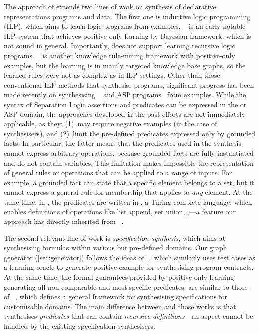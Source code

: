 The approach of \tool extends two lines of work on synthesis of
declarative representations programs and data.
%
The first one is inductive logic programming (ILP), which aims to
learn logic programs from examples.
~\cite{muggleton1997learning} is an early notable ILP
system that achieves positive-only learning by Bayesian framework,
which is not sound in general. Importantly,  does not
support learning recursive logic programs.
%
~\cite{galarraga2013amie} is another knowledge rule-mining
framework with positive-only examples, but the learning is in
 mainly targeted knowledge base graphs, so the learned
rules were not as complex as in ILP settings.
%
Other than those conventional ILP methods that synthesise \prolog
programs, significant progress has been made recently on synthesising
~\cite{thakkar2021example,10.1145/3622847} and ASP
programs~\cite{DBLP:conf/jelia/LawRB14,DBLP:conf/aaai/LawRBB020} from
examples.
%
While the syntax of Separation Logic assertions and predicates can be
expressed in the  or ASP domain, the approaches
developed in the past efforts are not immediately applicable, as they:
(1)~may require negative examples (in the case of 
synthesisers), and (2)~limit the pre-defined predicates expressed only
by grounded facts.
%
In particular, the latter means that the predicates used in the
synthesis cannot express arbitrary operations, because grounded facts
are fully instantiated and do not contain variables. 
%
This limitation makes impossible the representation of general rules
or operations that can be applied to a range of inputs. For example, a
grounded fact can state that a specific element belongs to a set, but
it cannot express a general rule for membership that applies to
\emph{any} element. 
%
At the same time, in \tool, the predicates are written in \prolog, a
Turing-complete language, which enables definitions of operations like
list append, set union, \etc,---a feature our approach has directly
inherited from \popper~\cite{cropper2021learning}.

The second relevant line of work is \emph{specification synthesis},
which aims at synthesising formulas within various but pre-defined
domains. 
%
Our graph generator (\autoref{sec:generator}) follows the ideas of
\precis~\cite{DBLP:journals/pacmpl/AstorgaSDWMX21}, which similarly
uses test cases as a learning oracle to generate positive example
for synthesising program contracts. 
%
At the same time, the formal guarantees provided by positive only
learning--generating all non-comparable and most specific predicates,
are similar to those of ~\cite{park2023synthesizing},
which defines a general framework for synthesising specifications for
customisable domains. The main difference between \tool and those
works is that \tool synthesises \emph{predicates} that can contain
\emph{recursive definitions}---an aspect cannot be handled by the
existing specification synthesisers.

